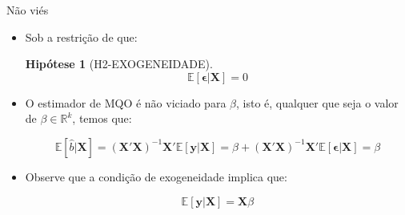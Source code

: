 \documentclass[11pt]{beamer}
\newtheorem{assumption}{Hipótese}
\begin{document}
\begin{frame}{Não viés}
\begin{itemize}
	\item Sob a restrição de que:
\begin{assumption}[H2-EXOGENEIDADE]
	$$\mathbb{E}[\boldsymbol{\epsilon}|\boldsymbol{X}]=0$$
	\end{assumption}
	\item O estimador de MQO é não viciado para $\beta$, isto é, qualquer que seja o valor de $\beta \in \mathbb{R}^k$, temos que:
	
	\begin{equation*}
	\mathbb{E}[\hat{b}|\boldsymbol{X} ]= (\boldsymbol{X}'\boldsymbol{X})^{-1}\boldsymbol{X}'\mathbb{E}[\boldsymbol{y}|\boldsymbol{X}] =\beta + (\boldsymbol{X}'\boldsymbol{X})^{-1}\boldsymbol{X}'\mathbb{E}[\boldsymbol{\epsilon}|\boldsymbol{X}]  = \beta 
	\end{equation*}
		\item Observe que a condição de exogeneidade implica que:
	
	$$\mathbb{E}[\boldsymbol{y}|\boldsymbol{X}] = \boldsymbol{X}\beta $$
\end{itemize}
\end{frame}
\end{document}

